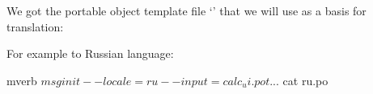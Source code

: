 We got the portable object template file `' that we will use
as a basis for translation:
For example to Russian language:
\begin{code}{mverb}
$ msginit --locale=ru --input=calc_ui.pot
...
$ cat ru.po
\end{code}
